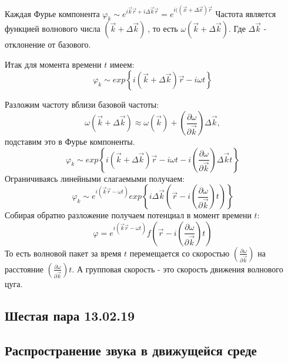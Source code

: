 \documentclass[14pt,a4paper,oneside]{extarticle}	%
\newcommand{\bracket}[1] {\left( #1 \right) } %
\newcommand{\dif}[2] {\bracket{ \frac{\partial #1}{\partial #2} }}
\begin{document}
Каждая Фурье компонента $ \varphi_{k}\sim e^{i\vec{k}\vec{r} + i\Delta\vec{k}\vec{r}}=e^{i((\vec{x}+\Delta\vec{x})\vec{r}} $
Частота является функцией волнового числа $ (\vec{k} + \Delta\vec{k}) \:$, то есть $ \omega(\vec{k} + \Delta\vec{k}) $. Где $ \Delta\vec{k} $ - отклонение от базового.

Итак для момента времени $ t $ имеем:
\begin{equation*}
\varphi_{k}\sim exp\left\lbrace i(\vec{k} + \Delta\vec{k})\vec{r}- i\omega t\right\rbrace 
\end{equation*}

Разложим частоту вблизи базовой частоты:
\begin{equation*}
\omega(\vec{k} + \Delta\vec{k})\approx \omega(\vec{k}) +\dif{\omega}{\vec{k}}\Delta\vec{k},
\end{equation*}
 подставим это в Фурье компоненты.
\begin{equation*}
\varphi_{k}\sim exp\left\lbrace i(\vec{k} + \Delta\vec{k})\vec{r}- i\omega t - i\dif{\omega}{\vec{k}}\Delta\vec{k}t \right\rbrace 
\end{equation*}
 Ограничиваясь линейными слагаемыми получаем:
\begin{equation*}
\varphi_{k}\sim e^{i(\vec{k}\vec{r}-\omega t)} 
exp\left\lbrace i\Delta\vec{k}(\vec{r} - i\dif{\omega}{\vec{k}}t) \right\rbrace 
\end{equation*}
Собирая обратно разложение получаем потенциал в момент времени $ t $:
\begin{equation*}
\varphi = e^{i(\vec{k}\vec{r}-\omega t)} f\left(\vec{r} - i\dif{\omega}{\vec{k}}t \right) 
\end{equation*}
То есть волновой пакет за время $ t $ перемещается со скоростью $ \dif{\omega}{\vec{k}} $ на расстояние $ \dif{\omega}{\vec{k}}t $.
А групповая скорость - это скорость движения волнового цуга.

\newpage
\begin{center}
	\section*{Шестая пара 13.02.19} %

	\subsection*{Распространение звука в движущейся среде} %
\end{center}
\end{document}
